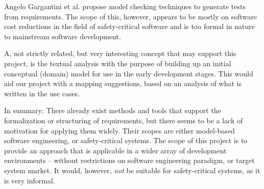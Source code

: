 \noindent Angelo Gargantini et al. propose model checking techniques to generate tests from requirements\cite{gargantini1999using}. The scope of this, however, appears to be mostly on software cost reductions in the field of safety-critical software and is too formal in nature to mainstream software development.\medskip

\noindent A, not strictly related, but very interesting concept that may support this project, is the textual analysis with the purpose of building up an initial conceptual (domain) model for use in the early development stages\cite{kop2010natural}. This would aid our project with a mapping suggestions, based on an analysis of what is written in the use cases.\medskip

\noindent In summary: There already exist methods and tools that support the formalization or structuring of requirements, but there seems to be a lack of motivation for applying them widely. Their scopes are either model-based software engineering, or safety-critical systems. The scope of this project is to provide an approach that is applicable in a wider array of development environments -- without restrictions on software engineering paradigm, or target system market. It would, however, \emph{not} be suitable for safety-critical systems, as it is very informal.